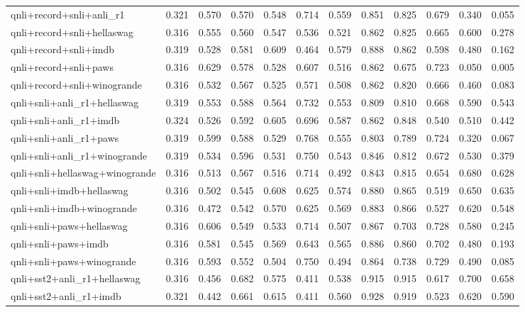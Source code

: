 \begin{table}[t]
\begin{tabular}{lrrrrrrrrrrr}
    qnli+record+snli+anli\_r1 & 0.321 & 0.570 & 0.570 & 0.548 & 0.714 & 0.559 & 0.851 & 0.825 & 0.679 & 0.340 & 0.055 \\
    qnli+record+snli+hellaswag & 0.316 & 0.555 & 0.560 & 0.547 & 0.536 & 0.521 & 0.862 & 0.825 & 0.665 & 0.600 & 0.278 \\
    qnli+record+snli+imdb & 0.319 & 0.528 & 0.581 & 0.609 & 0.464 & 0.579 & 0.888 & 0.862 & 0.598 & 0.480 & 0.162 \\
    qnli+record+snli+paws & 0.316 & 0.629 & 0.578 & 0.528 & 0.607 & 0.516 & 0.862 & 0.675 & 0.723 & 0.050 & 0.005 \\
    qnli+record+snli+winogrande & 0.316 & 0.532 & 0.567 & 0.525 & 0.571 & 0.508 & 0.862 & 0.820 & 0.666 & 0.460 & 0.083 \\
    qnli+snli+anli\_r1+hellaswag & 0.319 & 0.553 & 0.588 & 0.564 & 0.732 & 0.553 & 0.809 & 0.810 & 0.668 & 0.590 & 0.543 \\
    qnli+snli+anli\_r1+imdb & 0.324 & 0.526 & 0.592 & 0.605 & 0.696 & 0.587 & 0.862 & 0.848 & 0.540 & 0.510 & 0.442 \\
    qnli+snli+anli\_r1+paws & 0.319 & 0.599 & 0.588 & 0.529 & 0.768 & 0.555 & 0.803 & 0.789 & 0.724 & 0.320 & 0.067 \\
    qnli+snli+anli\_r1+winogrande & 0.319 & 0.534 & 0.596 & 0.531 & 0.750 & 0.543 & 0.846 & 0.812 & 0.672 & 0.530 & 0.379 \\
    qnli+snli+hellaswag+winogrande & 0.316 & 0.513 & 0.567 & 0.516 & 0.714 & 0.492 & 0.843 & 0.815 & 0.654 & 0.680 & 0.628 \\
    qnli+snli+imdb+hellaswag & 0.316 & 0.502 & 0.545 & 0.608 & 0.625 & 0.574 & 0.880 & 0.865 & 0.519 & 0.650 & 0.635 \\
    qnli+snli+imdb+winogrande & 0.316 & 0.472 & 0.542 & 0.570 & 0.625 & 0.569 & 0.883 & 0.866 & 0.527 & 0.620 & 0.548 \\
    qnli+snli+paws+hellaswag & 0.316 & 0.606 & 0.549 & 0.533 & 0.714 & 0.507 & 0.867 & 0.703 & 0.728 & 0.580 & 0.245 \\
    qnli+snli+paws+imdb & 0.316 & 0.581 & 0.545 & 0.569 & 0.643 & 0.565 & 0.886 & 0.860 & 0.702 & 0.480 & 0.193 \\
    qnli+snli+paws+winogrande & 0.316 & 0.593 & 0.552 & 0.504 & 0.750 & 0.494 & 0.864 & 0.738 & 0.729 & 0.490 & 0.085 \\
    qnli+sst2+anli\_r1+hellaswag & 0.316 & 0.456 & 0.682 & 0.575 & 0.411 & 0.538 & 0.915 & 0.915 & 0.617 & 0.700 & 0.658 \\
    qnli+sst2+anli\_r1+imdb & 0.321 & 0.442 & 0.661 & 0.615 & 0.411 & 0.560 & 0.928 & 0.919 & 0.523 & 0.620 & 0.590 \\

\end{tabular}
\end{table}
